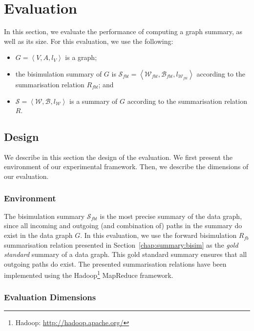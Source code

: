 \section{Evaluation}
\label{sec:summary:eval}

In this section, we evaluate the performance of computing a graph summary, as well as its size.
For this evaluation, we use the following:
\begin{itemize}
	\item $G=\left\langle V, A, l_V \right\rangle$ is a graph;
	\item the bisimulation summary of $G$ is $\mathcal{S}_{fbt} = \left\langle \mathcal{W}_{fbt}, \mathcal{B}_{fbt}, l_{\mathcal{W}_{fbt}} \right\rangle$ according to the summarisation relation $R_{fbt}$; and
	\item $\mathcal{S} = \left\langle \mathcal{W}, \mathcal{B}, l_{\mathcal{W}} \right\rangle$ is a summary of $G$ according to the summarisation relation $R$.
\end{itemize}

\subsection{Design}
\label{sec:eval:design}

We describe in this section the design of the evaluation. We first present the environment of our experimental framework. Then, we describe the dimensions of our evaluation.

\subsubsection{Environment}

The bisimulation summary $\mathcal{S}_{fbt}$ is the most precise summary of the data graph, since all incoming and outgoing (and combination of) paths in the summary do exist in the data graph $G$. In this evaluation, we use the forward bisimulation $R_{fb}$ summarisation relation presented in Section~\ref{chap:summary:bisim} as the \emph{gold standard} summary of a data graph. This gold standard summary ensures that all outgoing paths do exist. The presented summarisation relations have been implemented using the Hadoop\footnote{Hadoop: \url{http://hadoop.apache.org/}} MapReduce framework.

\subsubsection{Evaluation Dimensions}

